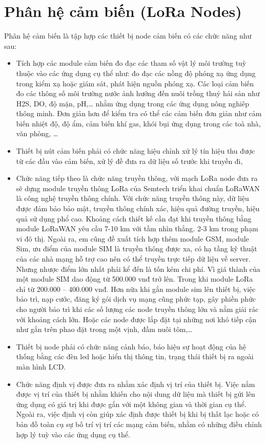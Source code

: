 \section{Phân hệ cảm biến (LoRa Nodes)}
Phân hệ cảm biến là tập hợp các thiết bị node cảm biến có các chức năng như sau:
\begin{itemize}
\item	Tích hợp các module cảm biến đo đạc các tham số vật lý môi trường tuỳ thuộc vào các ứng dụng cụ thể như: đo đạc các nồng độ phóng xạ ứng dụng trong kiểm xạ hoặc giám sát, phát hiện nguồn phóng xạ. Các loại cảm biến đo các thông số môi trường nước ảnh hưởng đến nuôi trồng thuỷ hải sản như H2S, DO, độ mặn, pH,… nhằm ứng dụng trong các ứng dụng nông nghiêp thông minh. Đơn giản hơn để kiểm tra có thể các cảm biến đơn giản như cảm biến nhiệt độ, độ ẩm, cảm biến khí gas, khói bụi ứng dụng trong các toà nhà, văn phòng, …
\item	Thiết bị nút cảm biến phải có chức năng hiệu chỉnh xử lý tín hiệu thu được từ các đầu vào cảm biến, xử lý đề đưa ra dữ liệu số trước khi truyền đi,
\item	Chức năng tiếp theo là chức năng truyền thông, với mạch LoRa node đưa ra sẽ dựng module truyền thông LoRa của Semtech triển khai chuẩn LoRaWAN là công nghệ truyền thông chính. Với chức năng truyền thông này, dữ liệu được đảm bảo bảo mật, truyền thông chính xác, hiệu quả đường truyền, hiệu quả sử dụng phổ cao. Khoảng cách thiết kế cần đạt khi truyền thông bằng module LoRaWAN yêu cầu 7-10 km với tầm nhìn thẳng. 2-3 km trong phạm vi đô thị. Ngoài ra, em cũng đề xuất tích hợp thêm module GSM, module Sim, ưu điểm của module SIM là truyền thông được xa, có hạ tầng kỹ thuật của các nhà mạng hỗ trợ cao nên có thể truyền trực tiếp dữ liệu về server. Nhưng nhược điểm lớn nhất phải kể đến là tốn kém chi phí. Vì giá thành của một module SIM dao động từ 500.000 vnđ trở lên. Trong khi module LoRa chỉ từ 200.000 – 400.000 vnđ. Hơn nữa khi gắn module sim lên thiết bị, việc bảo trì, nạp cước, đăng ký gói dịch vụ mạng cũng phức tạp, gây phiền phức cho người bảo trì khi các số lượng các node truyền thông lớn và nằm giải rác với khoảng cách lớn. Hoặc các node được lắp đặt tại những nơi khó tiếp cận như gắn trên phao đặt trong một vịnh, đầm nuôi tôm,… 
\item	Thiết bị node phải có chức năng cảnh báo, báo hiệu sự hoạt động của hệ thống bằng các đèn led hoặc hiển thị thông tin, trạng thái thiết bị ra ngoài màn hình LCD. 
\item	Chức năng định vị được đưa ra nhằm xác định vị trí của thiết bị. Việc nắm được vị trí của thiết bị nhằm khiến cho nội dung dữ liệu mà thiết bị gửi lên ứng dụng có giá trị khi được gắn với một không gian và thời gian cụ thể. Ngoài ra, việc định vị còn giúp xác định được thiết bị khi bị thất lạc hoặc có bản đồ toàn cụ sự bố trí vị trí các mạng cảm biến, nhằm có những điều chỉnh hợp lý tuỳ vào các ứng dụng cụ thể. 
\end{itemize}

